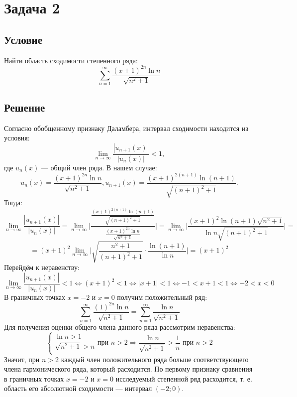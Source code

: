 \documentclass[12pt]{article}
\begin{document}
	\newpage

	\section*{Задача 2}	
	\subsection*{Условие}
	
	Найти область сходимости степенного ряда:
	$$ \sum_{n=1}^{\infty} \frac{(x + 1)^{2n} \ln{n}}{\sqrt{n^2 + 1}} $$

	\subsection*{Решение}

	Согласно обобщенному признаку Даламбера, интервал сходимости находится из условия:
	$$ \lim_{n \to \infty} \frac{|u_{n+1}(x)|}{|u_{n}(x)|} < 1 ,$$
	где $ u_{n}(x) $ --- общий член ряда. В нашем случае:
	$$ u_{n}(x) = \frac{(x + 1)^{2n} \ln{n}}{\sqrt{n^2 + 1}},  u_{n+1}(x) = \frac{(x + 1)^{2(n+1)} \ln{(n+1)}}{\sqrt{(n+1)^2 + 1}} .$$	
	Тогда: 
	$$ \lim_{n \to \infty} \frac{|u_{n+1}(x)|}{|u_{n}(x)|} = \lim_{n \to \infty} \Big| \frac{\frac{(x + 1)^{2(n+1)} \ln{(n+1)}}{\sqrt{(n+1)^2 + 1}}}{\frac{(x + 1)^{2n} \ln{n}}{\sqrt{n^2 + 1}}} \Big| = \lim_{n \to \infty} \Big| \frac{(x + 1)^2 \ln{(n+1)} \sqrt{n^2 + 1}}{\ln{n} \sqrt{(n+1)^2 + 1}} \Big| = $$
	$$ = (x + 1)^2 \lim_{n \to \infty} \Big| \sqrt{\frac{n^2 + 1}{(n+1)^2 + 1}} \cdot \frac{\ln{(n+1)} }{\ln{n} } \Big| = (x + 1)^2 $$
	Перейдём к неравенству:
	$$ \lim_{n \to \infty} \frac{|u_{n+1}(x)|}{|u_{n}(x)|} < 1 \Leftrightarrow (x + 1)^2 < 1 \Leftrightarrow |x + 1| < 1 \Leftrightarrow - 1 < x + 1 < 1 \Leftrightarrow - 2 < x < 0  $$
	В граничных точках $ x = - 2 $ и $ x = 0 $  получим положительный ряд:
	$$ \sum_{n=1}^{\infty} \frac{(1)^{2n} \ln{n}}{\sqrt{n^2 + 1}} = \sum_{n=1}^{\infty} \frac{ \ln{n}}{\sqrt{n^2 + 1}} $$
	Для получения оценки общего члена данного ряда рассмотрим неравенства:
	\begin{equation*}
		\begin{cases}
			\ln{n} > 1\\
			\sqrt{n^2 + 1} > n\\
		\end{cases}
		\text{при } n > 2 \Rightarrow \frac{ \ln{n}}{\sqrt{n^2 + 1}} > \frac{1}{n} \text{ при } n > 2 
	\end{equation*}
	Значит, при $ n > 2 $ каждый член положительного ряда больше соответствующего члена гармонического ряда, который расходится. По первому признаку сравнения в граничных точках $ x = - 2 $ и $ x = 0 $ исследуемый степенной ряд расходится, т. е. область его абсолютной сходимости --- интервал $ (-2;0) $.
\end{document}
